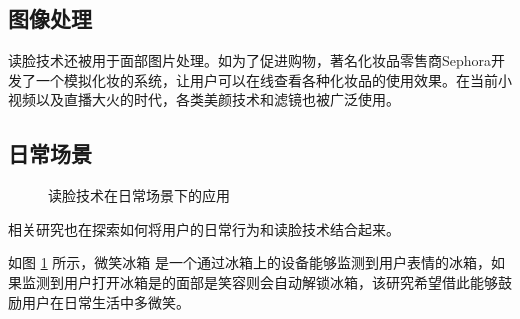 \subsection{图像处理}
读脸技术还被用于面部图片处理。如为了促进购物，著名化妆品零售商Sephora开发了一个模拟化妆的系统，让用户可以在线查看各种化妆品的使用效果\cite{Sephora}。在当前小视频以及直播大火的时代，各类美颜技术和滤镜也被广泛使用。

\subsection{日常场景}
\begin{figure}[h]
    \centering
    \caption{读脸技术在日常场景下的应用}
    \label{fig:smile}
\end{figure}
相关研究也在探索如何将用户的日常行为和读脸技术结合起来。

如图 \ref{fig:smile} 所示，微笑冰箱\cite{Tsujita2011Smiling} 是一个通过冰箱上的设备能够监测到用户表情的冰箱，如果监测到用户打开冰箱是的面部是笑容则会自动解锁冰箱，该研究希望借此能够鼓励用户在日常生活中多微笑。 


